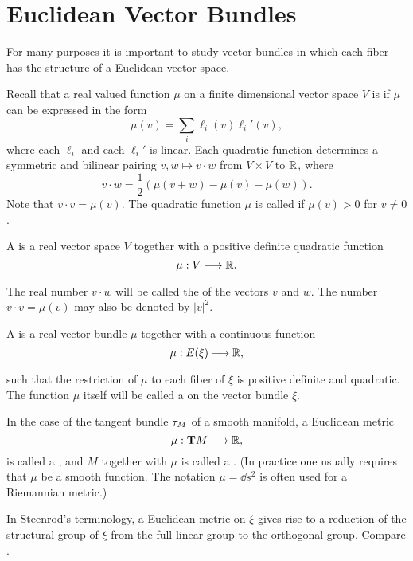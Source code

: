 \documentclass[../main]{subfiles}
\begin{document}
\section{Euclidean Vector Bundles}\label{sec:2.1}
For many purposes it is important to study vector bundles in which each fiber has the structure of a Euclidean vector space.

Recall that a real valued function $\mu$ on a finite dimensional vector
space $V$ is  if $\mu$ can be expressed in the form
\[
\mu(v)=\sum_{i} \ell_{i}(v) \ell_{i}' (v),
\]
where each $\ell_{i}$ and each $\ell_{i}'$ is linear. Each quadratic function determines a symmetric and bilinear pairing $v, w \mapsto v \cdot w$ from $V\times V$ to $\mathbb R$, where
\[
v \cdot w =\frac{1}{2}(\mu(v+w)-\mu(v)-\mu(w)).
\]
Note that $v \cdot v = \mu(v)$. The quadratic function $\mu$ is called  if $\mu(v) > 0$ for $v \neq 0$.


\begin{definition}\label{def:02.05}
A  is a real vector space $V$ together with a positive definite quadratic function	
\[
\mu : V \varrightarrow{} \bR.
\]
The real number $v \cdot w$ will be called the  of the vectors $v$ and $w$. The number $v \cdot v =\mu(v)$ may also be denoted by $|v|^2$.
\end{definition}


\begin{definition}\label{def:02.06}
A  is a real vector bundle $\mu$ together with a continuous function
\[
\mu : \total(\xi) \varrightarrow{} \bR,
\]
such that the restriction of $\mu$ to each fiber of $\xi$ is positive definite and quadratic. The function $\mu$ itself will be called a  on the vector bundle $\xi$.
	
In the case of the tangent bundle $\tau_{M}$ of a smooth manifold, a Euclidean metric
\[
\mu : \mathbf{T}M \longrightarrow \mathbb R,
\]
is called a , and $M$ together with $\mu$ is called a . (In practice one usually requires that $\mu$ be a smooth function. The notation $\mu= \dd s^2$ is often used for a Riemannian metric.)
\end{definition}


\begin{note}
In Steenrod's terminology, a Euclidean metric on $\xi$ gives rise to a reduction of the structural group of $\xi$ from the full linear group to the orthogonal group. Compare \cite[\S 12.9]{steenrod1951}.
\end{note}
\end{document}
